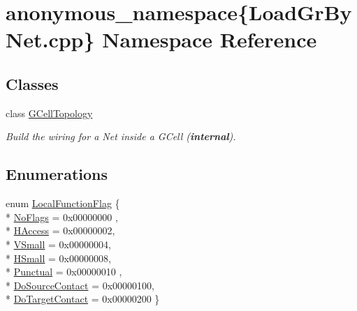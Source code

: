 \hypertarget{namespaceanonymous__namespace_02LoadGrByNet_8cpp_03}{\section{anonymous\-\_\-namespace\{Load\-Gr\-By\-Net.\-cpp\} Namespace Reference}
\label{namespaceanonymous__namespace_02LoadGrByNet_8cpp_03}
}
\subsection*{Classes}
\begin{DoxyCompactItemize}
\item 
class \hyperlink{classanonymous__namespace_02LoadGrByNet_8cpp_03_1_1GCellTopology}{G\-Cell\-Topology}
\begin{DoxyCompactList}\small\item\em Build the wiring for a Net inside a G\-Cell ({\bfseries internal}). \end{DoxyCompactList}\end{DoxyCompactItemize}
\subsection*{Enumerations}
\begin{DoxyCompactItemize}
\item 
enum \hyperlink{group__LoadGlobalRouting_gaec07c7f30c801c3b0f72193757250d64}{Local\-Function\-Flag} \{ \\*
\hyperlink{group__LoadGlobalRouting_ggaec07c7f30c801c3b0f72193757250d64add44bf8d6f7bbe1393d76b940b85294b}{No\-Flags} = 0x00000000
, \\*
\hyperlink{group__LoadGlobalRouting_ggaec07c7f30c801c3b0f72193757250d64a5c3692a6c886c6293a3c9f240b60a5d9}{H\-Access} = 0x00000002, 
\\*
\hyperlink{group__LoadGlobalRouting_ggaec07c7f30c801c3b0f72193757250d64a260f6bf57246879aed7febfe83c9dacc}{V\-Small} = 0x00000004, 
\\*
\hyperlink{group__LoadGlobalRouting_ggaec07c7f30c801c3b0f72193757250d64af1a4f1cb841460f20d26dcf902247fb8}{H\-Small} = 0x00000008, 
\\*
\hyperlink{group__LoadGlobalRouting_ggaec07c7f30c801c3b0f72193757250d64a65b52a199afe857e3d551dbac8b293b9}{Punctual} = 0x00000010
, \\*
\hyperlink{group__LoadGlobalRouting_ggaec07c7f30c801c3b0f72193757250d64aece46caaf822b33d7db94bb2dd16a30d}{Do\-Source\-Contact} = 0x00000100, 
\\*
\hyperlink{group__LoadGlobalRouting_ggaec07c7f30c801c3b0f72193757250d64aeb33c01c5e62df73de6b11888b17a5f2}{Do\-Target\-Contact} = 0x00000200
 \}
\end{DoxyCompactItemize}
